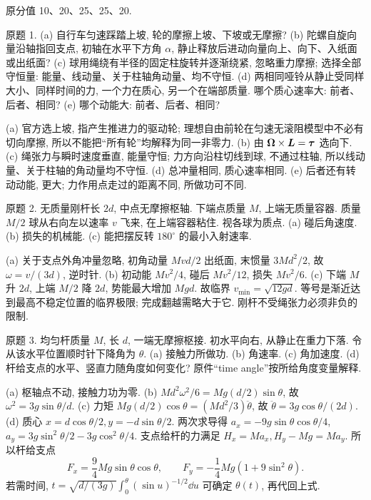 原分值 10、20、25、25、20.
\begin{exercise}
原题 1. (a) 自行车匀速踩踏上坡, 轮的摩擦上坡、下坡或无摩擦? (b) 陀螺自旋向量沿轴指回支点, 初轴在水平下方角 $\alpha$, 静止释放后进动向量向上、向下、入纸面或出纸面? (c) 球用绳绕有半径的固定柱旋转并逐渐绕紧, 忽略重力摩擦; 选择全部守恒量: 能量、线动量、关于柱轴角动量、均不守恒. (d) 两相同哑铃从静止受同样大小、同样时间的力, 一个力在质心, 另一个在端部质量. 哪个质心速率大: 前者、后者、相同? (e) 哪个动能大: 前者、后者、相同?
\end{exercise}
\begin{solution}
(a) 官方选上坡, 指产生推进力的驱动轮; 理想自由前轮在匀速无滚阻模型中不必有切向摩擦, 所以不能把“所有轮”均解释为同一非零力. (b) 由 $\boldsymbol{\Omega}\times\boldsymbol{L}=\boldsymbol{\tau}$ 选向下. (c) 绳张力与瞬时速度垂直, 能量守恒; 力方向沿柱切线到球, 不通过柱轴, 所以线动量、关于柱轴的角动量均不守恒. (d) 总冲量相同, 质心速率相同. (e) 后者还有转动动能, 更大; 力作用点走过的距离不同, 所做功可不同.
\end{solution}
\begin{exercise}
原题 2. 无质量刚杆长 $2d$, 中点无摩擦枢轴. 下端点质量 $M$, 上端无质量容器. 质量 $M/2$ 球从右向左以速率 $v$ 飞来, 在上端容器粘住. 视各球为质点. (a) 碰后角速度. (b) 损失的机械能. (c) 能把摆反转 $180^\circ$ 的最小入射速率.
\end{exercise}
\begin{solution}
(a) 关于支点外角冲量忽略, 初角动量 $Mvd/2$ 出纸面, 末惯量 $3Md^2/2$, 故 $\omega=v/(3d)$, 逆时针. (b) 初动能 $Mv^2/4$, 碰后 $Mv^2/12$, 损失 $Mv^2/6$. (c) 下端 $M$ 升 $2d$, 上端 $M/2$ 降 $2d$, 势能最大增加 $Mgd$. 故临界 $v_{\min}=\sqrt{12gd}$. 等号是渐近达到最高不稳定位置的临界极限; 完成翻越需略大于它. 刚杆不受绳张力必须非负的限制.
\end{solution}
\begin{exercise}
原题 3. 均匀杆质量 $M$, 长 $d$, 一端无摩擦枢接. 初水平向右, 从静止在重力下落. 令从该水平位置顺时针下降角为 $\theta$. (a) 接触力所做功. (b) 角速率. (c) 角加速度. (d) 杆给支点的水平、竖直力随角度如何变化? 原件“time angle”按所给角度变量解释.
\end{exercise}
\begin{solution}
(a) 枢轴点不动, 接触力功为零. (b) $Md^2\omega^2/6=Mg(d/2)\sin\theta$, 故 $\omega^2=3g\sin\theta/d$. (c) 力矩 $Mg(d/2)\cos\theta=(Md^2/3)\ddot\theta$, 故 $\ddot\theta=3g\cos\theta/(2d)$. (d) 质心 $x=d\cos\theta/2,y=-d\sin\theta/2$. 两次求导得 $a_x=-9g\sin\theta\cos\theta/4$, $a_y=3g\sin^2\theta/2-3g\cos^2\theta/4$. 支点给杆的力满足 $H_x=Ma_x,H_y-Mg=Ma_y$. 所以杆给支点
\[F_x=\frac94Mg\sin\theta\cos\theta,\qquad F_y=-\frac14Mg(1+9\sin^2\theta).\]
若需时间, $t=\sqrt{d/(3g)}\int_0^\theta(\sin u)^{-1/2}\dd u$ 可确定 $\theta(t)$, 再代回上式.
\end{solution}
